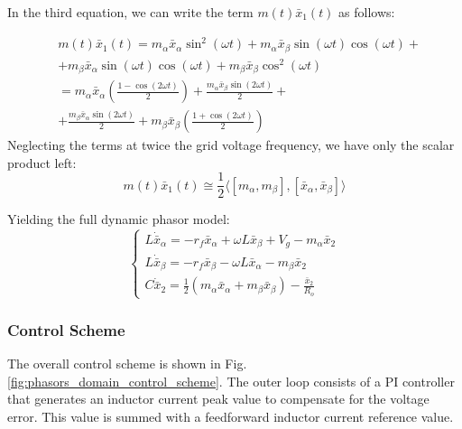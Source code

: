 \documentclass[DIV=calc, paper=a4, fontsize=11pt, twocolumn]{scrartcl}	 %
\begin{document}
In the third equation, we can write the term $m(t)\bar{x}_1(t)$ as follows:

{\small
\begin{equation}
\begin{split}
&m(t)\bar{x}_1(t) = m_\alpha \bar{x}_\alpha \sin^2(\omega t) + m_\alpha \bar{x}_\beta \sin(\omega t)\cos(\omega t) +\\
&+ m_\beta \bar{x}_\alpha \sin(\omega t) \cos(\omega t) + m_\beta \bar{x}_\beta \cos^2(\omega t) \\
&= m_\alpha \bar{x}_\alpha \left(\frac{1 - \cos(2\omega t)}{2}\right) + \frac{m_\alpha \bar{x}_\beta \sin(2\omega t)}{2} + \\
&+\frac{m_\beta \bar{x}_\alpha \sin(2\omega t)}{2}+
 m_\beta \bar{x}_\beta \left(\frac{1 + \cos(2\omega t)}{2}\right)
\end{split}
\end{equation}
}
Neglecting the terms at twice the grid voltage frequency, we have only the scalar product left:
\begin{equation}
    m(t)\bar{x}_1(t) \cong \frac{1}{2} \langle [m_\alpha, m_\beta], [\bar{x}_\alpha, \bar{x}_\beta] \rangle
\end{equation}

Yielding the full dynamic phasor model:
\begin{equation}
    \begin{cases} 
        L \dot{\bar{x}}_\alpha = -r_f \bar{x}_\alpha + \omega L \bar{x}_\beta + V_g - m_\alpha \bar{x}_2 \\[8pt]
        L \dot{\bar{x}}_\beta = -r_f \bar{x}_\beta - \omega L \bar{x}_\alpha - m_\beta \bar{x}_2 \\[8pt]
        C \dot{\bar{x}}_2 = \frac{1}{2}(m_\alpha \bar{x}_\alpha + m_\beta \bar{x}_\beta) - \frac{\bar{x}_2}{R_o}
    \end{cases}
\end{equation}
\subsubsection{Control Scheme}


The overall control scheme is shown in Fig. \ref{fig:phasors_domain_control_scheme}. The outer loop consists of a PI controller that generates an inductor current peak value to compensate for the voltage error. This value is summed with a feedforward inductor current reference value.
\end{document}
